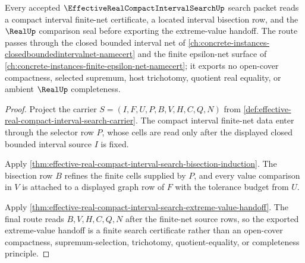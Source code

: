 \begin{theorem}
\label{thm:effective-real-compact-interval-search-net-handoff}
Every accepted $\EffectiveRealCompactIntervalSearchUp$ search packet reads a compact interval finite-net certificate, a located interval bisection row, and the $\RealUp$ comparison seal before exporting the extreme-value handoff. The route passes through the closed bounded interval net of \autoref{ch:concrete-instances-closedboundedintervalnet-namecert} and the finite epsilon-net surface of \autoref{ch:concrete-instances-finite-epsilon-net-namecert}; it exports no open-cover compactness, selected supremum, host trichotomy, quotient real equality, or ambient $\RealUp$ completeness.
\end{theorem}
\begin{proof}
Project the carrier $S=(I,F,U,P,B,V,H,C,Q,N)$ from \autoref{def:effective-real-compact-interval-search-carrier}. The compact interval finite-net data enter through the selector row $P$, whose cells are read only after the displayed closed bounded interval source $I$ is fixed.

Apply \autoref{thm:effective-real-compact-interval-search-bisection-induction}. The bisection row $B$ refines the finite cells supplied by $P$, and every value comparison in $V$ is attached to a displayed graph row of $F$ with the tolerance budget from $U$.

Apply \autoref{thm:effective-real-compact-interval-search-extreme-value-handoff}. The final route reads $B,V,H,C,Q,N$ after the finite-net source rows, so the exported extreme-value handoff is a finite search certificate rather than an open-cover compactness, supremum-selection, trichotomy, quotient-equality, or completeness principle.
\end{proof}

